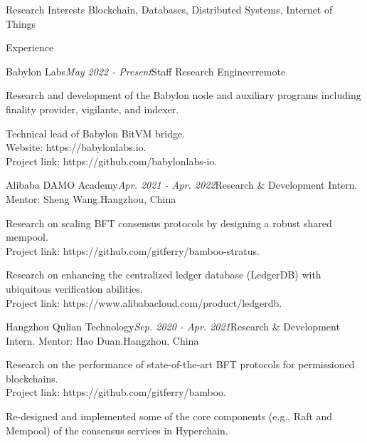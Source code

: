 \documentclass{resume} %
\begin{document}
\begin{rSection}{Research Interests}
Blockchain, Databases, Distributed Systems, Internet of Things
\end{rSection}


\begin{rSection}{Experience}

\begin{rSubsection}{Babylon Labs}{\em May 2022 - Present}{Staff Research Engineer}{remote}
\item Research and development of the Babylon node and auxiliary programs including finality provider, vigilante, and indexer.
\item Technical lead of Babylon BitVM bridge.
\\Website: https://babylonlabs.io.
\\Project link: https://github.com/babylonlabs-io.
\end{rSubsection}

\begin{rSubsection}{Alibaba DAMO Academy}{\em Apr. 2021 - Apr. 2022}{Research \& Development Intern. Mentor: Sheng Wang.}{Hangzhou, China}
\item Research on scaling BFT consensus protocols by designing a robust shared mempool.
\\Project link: https://github.com/gitferry/bamboo-stratus.
\item Research on enhancing the centralized ledger database (LedgerDB) with ubiquitous verification abilities.
\\Project link: https://www.alibabacloud.com/product/ledgerdb.
\end{rSubsection}


\begin{rSubsection}{Hangzhou Qulian Technology}{\em Sep. 2020 - Apr. 2021}{Research \& Development Intern. Mentor: Hao Duan.}{Hangzhou, China}
\item Research on the performance of state-of-the-art BFT protocols for permissioned blockchains.
\\Project link: https://github.com/gitferry/bamboo.
\item Re-designed and implemented some of the core components (e.g., Raft and Mempool) of the consensus services in Hyperchain.
\end{rSubsection}


\end{rSection}
\end{document}
